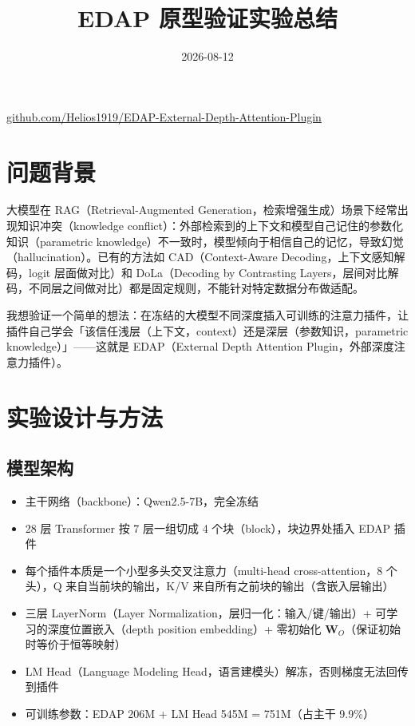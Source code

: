 \documentclass[11pt,a4paper]{ctexart}
\title{EDAP 原型验证实验总结}
\author{}
\date{2026-08-12}
\begin{document}
\maketitle

\begin{center}
\small\href{https://github.com/Helios1919/EDAP-External-Depth-Attention-Plugin/tree/exp/edap-poc}{github.com/Helios1919/EDAP-External-Depth-Attention-Plugin}
\end{center}

\section{问题背景}

大模型在 RAG（Retrieval-Augmented Generation，检索增强生成）场景下经常出现知识冲突（knowledge conflict）：外部检索到的上下文和模型自己记住的参数化知识（parametric knowledge）不一致时，模型倾向于相信自己的记忆，导致幻觉（hallucination）。已有的方法如 CAD（Context-Aware Decoding，上下文感知解码，logit 层面做对比）和 DoLa（Decoding by Contrasting Layers，层间对比解码，不同层之间做对比）都是固定规则，不能针对特定数据分布做适配。

我想验证一个简单的想法：在冻结的大模型不同深度插入可训练的注意力插件，让插件自己学会「该信任浅层（上下文，context）还是深层（参数知识，parametric knowledge）」——这就是 EDAP（External Depth Attention Plugin，外部深度注意力插件）。

\section{实验设计与方法}

\subsection{模型架构}

\begin{itemize}
    \item 主干网络（backbone）：Qwen2.5-7B，完全冻结
    \item 28 层 Transformer 按 7 层一组切成 4 个块（block），块边界处插入 EDAP 插件
    \item 每个插件本质是一个小型多头交叉注意力（multi-head cross-attention，8 个头），Q 来自当前块的输出，K/V 来自所有之前块的输出（含嵌入层输出）
    \item 三层 LayerNorm（Layer Normalization，层归一化：输入/键/输出）+ 可学习的深度位置嵌入（depth position embedding）+ 零初始化 $\mathbf{W}_O$（保证初始时等价于恒等映射）
    \item LM Head（Language Modeling Head，语言建模头）解冻，否则梯度无法回传到插件
    \item 可训练参数：EDAP 206M + LM Head 545M = 751M（占主干 9.9\%）
\end{itemize}
\end{document}
